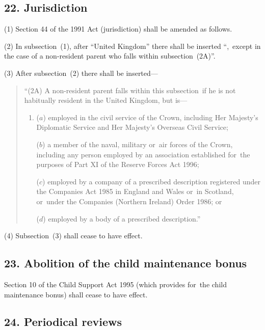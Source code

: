 \documentclass[12pt,a4paper]{article}
\begin{document}
\subsection{22. Jurisdiction}

(1) Section 44 of the 1991 Act (jurisdiction) shall be amended as follows.
 
(2) In subsection~(1), after “United Kingdom” there shall be inserted “,~except in the case of a non-resident parent who falls within subsection~(2A)”.

(3) After subsection~(2)  there shall be inserted—
\begin{quotation}
“(2A) A non-resident parent falls within this subsection~if he is not habitually resident in the United Kingdom, but is—
\begin{enumerate}\item[]
($a$) employed in the civil service of the Crown, including Her Majesty’s Diplomatic Service and Her Majesty’s Overseas Civil Service;

($b$) a member of the naval, military or~air forces of the Crown, including any person employed by an association established for~the purposes of Part XI of the Reserve Forces Act 1996;

($c$) employed by a company of a prescribed description registered under the Companies Act 1985 in England and Wales or~in Scotland, or~under the Companies (Northern Ireland) Order 1986; or

($d$) employed by a body of a prescribed description.”
\end{enumerate}
\end{quotation}

(4) Subsection~(3)  shall cease to have effect.


\subsection{23. Abolition of the child maintenance bonus}

Section 10 of the Child Support Act 1995 (which provides for~the child maintenance bonus) shall cease to have effect.

\subsection{24. Periodical reviews}
\end{document}
